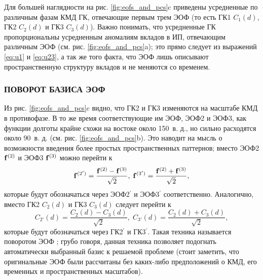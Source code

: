 Для большей наглядности на рис. \ref{fig:eofs_and_pcs}{c} приведены усредненные по различным фазам КМД ГК, отвечающие первым трем ЭОФ (то есть ГК1 $C_1(d)$, ГК2 $C_2(d)$ и ГК3 $C_3(d)$). Важно понимать, что усредненные ГК пропорциональны усредненным аномалиям вкладов в ИП, отвечающим различным ЭОФ (см. рис. \ref{fig:eofs_and_pcs}{a}); это прямо следует из выражений \eqref{eq:u1} и \eqref{eq:u23}, а так же того факта, что ЭОФ лишь описывают пространственную структуру вкладов и не меняются со временем.

\subsubsection{ПОВОРОТ БАЗИСА ЭОФ}
\label{sec:rot_eof}

Из рис. \ref{fig:eofs_and_pcs}{c} видно, что ГК2 и ГК3 изменяются на масштабе КМД в противофазе. В то же время соответствующие им ЭОФ, ЭОФ2 и ЭОФ3, как функции долготы крайне схожи на востоке около 150\textdegree\ в. д., но сильно расходятся около 90\textdegree\ в. д. (см. рис. \ref{fig:eofs_and_pcs}{b}). Это наводит на мысль о возможности введения более простых пространственных паттернов; вместо ЭОФ2 $\vb{f}^{(2)}$ и ЭОФ3 $\vb{f}^{(3)}$ можно перейти к
\begin{equation}
    \vb{f}^{(2')} = \dfrac{\vb{f}^{(2)} - \vb{f}^{(3)}}{\sqrt{2}},\; \vb{f}^{(3')} = \dfrac{\vb{f}^{(2)} + \vb{f}^{(3)}}{\sqrt{2}},
\end{equation}
которые будут обозначаться через ЭОФ2$^\prime$ и ЭОФ3$^\prime$ соответственно. Аналогично, вместо ГК2 $C_2(d)$ и ГК3 $C_3(d)$ следует перейти к 
\begin{equation}
    C_{2'}(d) = \dfrac{C_2(d) - C_3(d)}{\sqrt{2}} ,\;  C_{3'}(d)  = \dfrac{C_2(d) + C_3(d)}{\sqrt{2}},
\end{equation}
которые будут обозначаться через ГК2$^\prime$ и ГК3$^\prime$. Такая техника называется поворотом ЭОФ \cite[Гл. 6]{Zhang_Moore_2015}; грубо говоря, данная техника позволяет подогнать автоматически выбранный базис к решаемой проблеме (стоит заметить, что оригинальные ЭОФ были рассчитаны без каких-либо предположений о КМД, его временных и пространственных масштабов).

